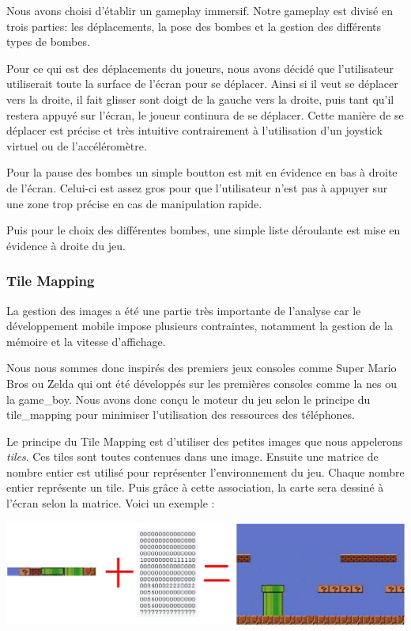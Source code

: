 		Nous avons choisi d'établir un gameplay immersif.
		Notre gameplay est divisé en trois parties: les déplacements, la pose des bombes et la gestion des différents types de bombes.
		
		Pour ce qui est des déplacements du joueurs, nous avons décidé que 
		l'utilisateur utiliserait toute la surface de l'écran pour se déplacer.
		Ainsi si il veut se déplacer vers la droite, il fait glisser sont doigt 
		de la gauche vers la droite, puis tant qu'il restera appuyé sur l'écran,
		le joueur continura de se déplacer.
		Cette manière de se déplacer est précise et très intuitive contrairement
		à l'utilisation d'un joystick virtuel ou de l'accéléromètre.
		
		Pour la pause des bombes un simple boutton est mit en évidence en bas à
		 droite de l'écran.
		 Celui-ci est assez gros pour que l'utilisateur n'est pas à appuyer sur
		 une zone trop précise en cas de manipulation rapide.
		
		Puis pour le choix des différentes bombes, une simple liste déroulante 
		est mise en évidence à droite du jeu.\\
		
		\subsubsection{Tile Mapping}

			La gestion des images a été une partie très importante de l'analyse
			car le développement mobile impose plusieurs contraintes, notamment 
			la gestion de la mémoire et la vitesse d'affichage.
			
			Nous nous sommes donc inspirés des premiers jeux consoles comme 
			Super Mario Bros ou Zelda qui ont été développés sur les premières 
			consoles comme la \gls{nes} ou la \gls{game_boy}.
			Nous avons donc conçu le moteur du jeu selon le principe du \gls{tile_mapping} 
			pour minimiser l'utilisation des ressources des téléphones.
		
			Le principe du Tile Mapping est d'utiliser des petites images que nous appelerons \textit{tiles}.
			Ces tiles sont toutes contenues dans une image.
			Ensuite une matrice de nombre entier est utilisé pour représenter l'environnement du jeu.
			Chaque nombre entier représente un tile.
			Puis grâce à cette association, la carte sera dessiné à l'écran selon la matrice.
			Voici un exemple :
		
			\includegraphics[width=15cm]{./Analyse/Img/tileMapping.eps}
		
